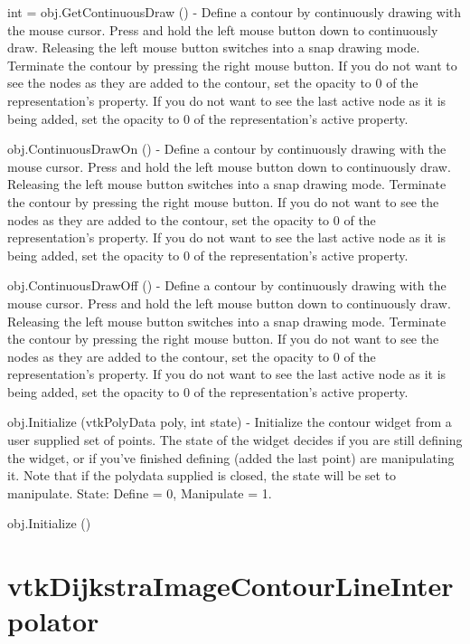 \begin{DoxyItemize}
\item {\ttfamily int = obj.\-Get\-Continuous\-Draw ()} -\/ Define a contour by continuously drawing with the mouse cursor. Press and hold the left mouse button down to continuously draw. Releasing the left mouse button switches into a snap drawing mode. Terminate the contour by pressing the right mouse button. If you do not want to see the nodes as they are added to the contour, set the opacity to 0 of the representation's property. If you do not want to see the last active node as it is being added, set the opacity to 0 of the representation's active property.  
\item {\ttfamily obj.\-Continuous\-Draw\-On ()} -\/ Define a contour by continuously drawing with the mouse cursor. Press and hold the left mouse button down to continuously draw. Releasing the left mouse button switches into a snap drawing mode. Terminate the contour by pressing the right mouse button. If you do not want to see the nodes as they are added to the contour, set the opacity to 0 of the representation's property. If you do not want to see the last active node as it is being added, set the opacity to 0 of the representation's active property.  
\item {\ttfamily obj.\-Continuous\-Draw\-Off ()} -\/ Define a contour by continuously drawing with the mouse cursor. Press and hold the left mouse button down to continuously draw. Releasing the left mouse button switches into a snap drawing mode. Terminate the contour by pressing the right mouse button. If you do not want to see the nodes as they are added to the contour, set the opacity to 0 of the representation's property. If you do not want to see the last active node as it is being added, set the opacity to 0 of the representation's active property.  
\item {\ttfamily obj.\-Initialize (vtk\-Poly\-Data poly, int state)} -\/ Initialize the contour widget from a user supplied set of points. The state of the widget decides if you are still defining the widget, or if you've finished defining (added the last point) are manipulating it. Note that if the polydata supplied is closed, the state will be set to manipulate. State\-: Define = 0, Manipulate = 1.  
\item {\ttfamily obj.\-Initialize ()}  
\end{DoxyItemize}\hypertarget{vtkwidgets_vtkdijkstraimagecontourlineinterpolator}{}\section{vtk\-Dijkstra\-Image\-Contour\-Line\-Interpolator}\label{vtkwidgets_vtkdijkstraimagecontourlineinterpolator}
